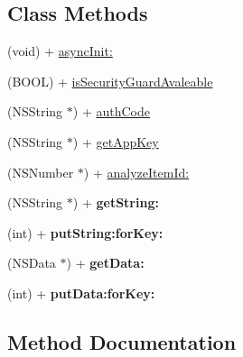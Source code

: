 \subsection*{Class Methods}
\begin{DoxyCompactItemize}
\item 
(void) + \mbox{\hyperlink{interface_alibc_security_guard_bridge_ad280fc6693fe8e4d6996f56c3ad7a758}{async\+Init\+:}}
\item 
(B\+O\+OL) + \mbox{\hyperlink{interface_alibc_security_guard_bridge_af7449b81d190d919f1be363502f6da1d}{is\+Security\+Guard\+Avaleable}}
\item 
(N\+S\+String $\ast$) + \mbox{\hyperlink{interface_alibc_security_guard_bridge_a797503616295719786f25a327510e076}{auth\+Code}}
\item 
(N\+S\+String $\ast$) + \mbox{\hyperlink{interface_alibc_security_guard_bridge_a33246f4937b6364e7a652c8397c7feca}{get\+App\+Key}}
\item 
(N\+S\+Number $\ast$) + \mbox{\hyperlink{interface_alibc_security_guard_bridge_aff8de89b19c232a0d2e800c2577b84c4}{analyze\+Item\+Id\+:}}
\item 
\mbox{\label{interface_alibc_security_guard_bridge_aef0f148fd4e103e2b6846677e12b8abf}} 
(N\+S\+String $\ast$) + {\bfseries get\+String\+:}
\item 
\mbox{\label{interface_alibc_security_guard_bridge_a407766864a8834caafc892b82620bc32}} 
(int) + {\bfseries put\+String\+:for\+Key\+:}
\item 
\mbox{\label{interface_alibc_security_guard_bridge_a411cb3ad6dcc3ddad6c402969c6a9ed0}} 
(N\+S\+Data $\ast$) + {\bfseries get\+Data\+:}
\item 
\mbox{\label{interface_alibc_security_guard_bridge_a48124ea2f7e2763e5863338c35f2327d}} 
(int) + {\bfseries put\+Data\+:for\+Key\+:}
\end{DoxyCompactItemize}


\subsection{Method Documentation}
\mbox{\label{interface_alibc_security_guard_bridge_aff8de89b19c232a0d2e800c2577b84c4}} 
